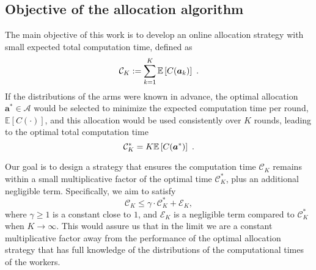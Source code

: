 \subsection{Objective of the allocation algorithm}
The main objective of this work is to develop an online allocation strategy with small expected total computation time, defined as 
$$
	\mathcal{C}_K := \sum_{k=1}^{K} \mathbb{E}\left[C(\bm{a}_k)\right]~.
$$
If the distributions of the arms were known in advance, the optimal allocation $\bm{a}^* \in \mathcal{A}$ would be selected to minimize the expected computation time per round, $\mathbb{E}[C(\cdot)]$, and this allocation would be used consistently over $K$ rounds, leading to the optimal total computation time 
$$
	\mathcal{C}^*_K = K \mathbb{E}\left[C(\bm{a}^*)\right]~.
$$

Our goal is to design a strategy that ensures the computation time $\mathcal{C}_K$ remains within a small multiplicative factor of the optimal time $\mathcal{C}^*_K$, plus an additional negligible term. Specifically, we aim to satisfy
\begin{equation}\label{eq:ata_obj}
	\mathcal{C}_K \leq \gamma \cdot \mathcal{C}^*_K + \mathcal{E}_K,	
\end{equation}
where $\gamma \geq 1$ is a constant close to $1$, and $\mathcal{E}_K$ is a negligible term compared to $\mathcal{C}^*_K$ when $K\to \infty$. This would assure us that in the limit we are a constant multiplicative factor away from the performance of the optimal allocation strategy that has full knowledge of the distributions of the computational times of the workers.



  
